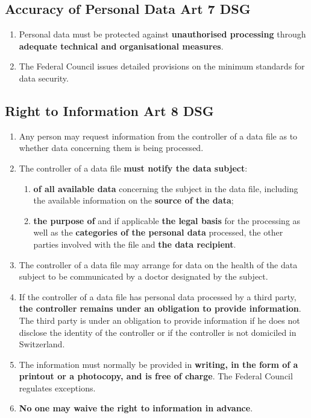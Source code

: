 \documentclass[11pt]{article}
\theoremstyle{definition}
\begin{document}
\subsection{Accuracy of Personal Data Art 7 DSG}
\begin{enumerate}[label=\arabic*]
	\item Personal data must be protected against \textbf{unauthorised processing} through \textbf{adequate technical and organisational measures}.
	\item The Federal Council issues detailed provisions on the minimum standards for data security.
\end{enumerate}

\subsection{Right to Information Art 8 DSG}
\begin{enumerate}[label=\arabic*]
	\item Any person may request information from the controller of a data file as to whether data concerning them is being processed.
	\item The controller of a data file \textbf{must notify the data subject}:
	\begin{enumerate}[label=\alph*.]
		\item \textbf{of all available data} concerning the subject in the data file, including the available information on the \textbf{source of the data};
		\item \textbf{the purpose of} and if applicable \textbf{the legal basis} for the processing as well as the \textbf{categories of the personal data} processed, the other parties involved with the file and \textbf{the data recipient}.
	\end{enumerate}
	\item The controller of a data file may arrange for data on the health of the data subject to be communicated by a doctor designated by the subject.
	\item If the controller of a data file has personal data processed by a third party, \textbf{the controller remains under an obligation to provide information}. The third party is under an obligation to provide information if he does not disclose the identity of the controller or if the controller is not domiciled in Switzerland.
	\item The information must normally be provided in \textbf{writing, in the form of a printout or a photocopy, and is free of charge}. The Federal Council regulates exceptions.
	\item \textbf{No one may waive the right to information in advance}.
\end{enumerate}
\end{document}
